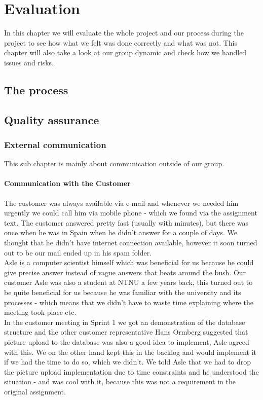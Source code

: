 \chapter{Evaluation}
In this chapter we will evaluate the whole project and our process during the project to see how what we felt was done correctly and what was not. This chapter will also take a look at our group dynamic and check how we handled issues and risks.

\section{The process}


\section{Quality assurance}
\subsection{External communication}
This sub chapter is mainly about communication outside of our group.
\subsubsection{Communication with the Customer}
The customer was always available via e-mail and whenever we needed him urgently we could call him via mobile phone - which we found via the assignment text. The customer answered pretty fast (usually with minutes), but there was once when he was in Spain when he didn't answer for a couple of days. We thought that he didn't have internet connection available, however it soon turned out to be our mail ended up in his spam folder.\\
Asle is a computer scientist himself which was beneficial for us because he could give precise answer instead of vague answers that beats around the bush. Our customer Asle was also a student at NTNU a few years back, this turned out to be quite beneficial for us because he was familiar with the university and its processes - which means that we didn't have to waste time explaining where the meeting took place etc. \\
In the customer meeting in Sprint 1 we got an demonstration of the database structure and the other customer representative Hans Ormberg suggested that picture upload to the database was also a good idea to implement, Asle agreed with this. We on the other hand kept this in the backlog and would implement it if we had the time to do so, which we didn't. We told Asle that we had to drop the picture upload implementation due to time constraints and he understood the situation - and was cool with it, because this was not a requirement in the original assignment.

